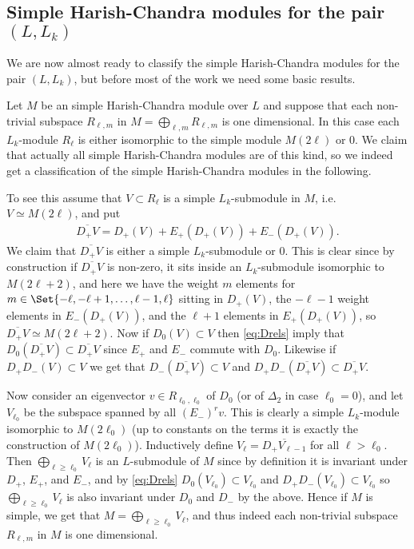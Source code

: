 \subsection{\texorpdfstring{Simple Harish-Chandra modules for the pair $(L,L_k)$}{Simple Harish-Chandra modules for the pair (L,L\_k)}}\label{sec:simplemodules}

We are now almost ready to classify the simple Harish-Chandra modules for the pair $(L,L_k)$, but before most of the work we need some basic results.

Let $M$ be an simple Harish-Chandra module over $L$ and suppose that each non-trivial subspace $R_{\ell,m}$ in $M=\bigoplus_{\ell,m} R_{\ell,m}$ is one dimensional. In this case each $L_k$-module $R_\ell$ is either isomorphic to the simple module $M(2\ell)$ or $0$. We claim that actually all simple Harish-Chandra modules are of this kind, so we indeed get a classification of the simple Harish-Chandra modules in the following.

To see this assume that $V\subset R_\ell$ is a simple $L_k$-submodule in $M$, i.e.\ $V\simeq M(2\ell)$, and put
\begin{align*}
  \overline{D_+V} = D_+(V) + E_+(D_+(V)) + E_-(D_+(V)).
\end{align*}
We claim that $\overline{D_+V}$ is either a simple $L_k$-submodule or $0$. This is clear since by construction if $\overline{D_+V}$ is non-zero, it sits inside an $L_k$-submodule isomorphic to $M(2\ell+2)$, and here we have the weight $m$ elements for $m\in\Set{-\ell,-\ell+1,\dotsc,\ell-1,\ell}$ sitting in $D_+(V)$, the $-\ell-1$ weight elements in $E_-(D_+(V))$, and the $\ell+1$ elements in $E_+(D_+(V))$, so $\overline{D_+V}\simeq M(2\ell+2)$. Now if $D_0(V)\subset V$ then \cref{eq:Drels} imply that $D_0(\overline{D_+V})\subset \overline{D_+V}$ since $E_+$ and $E_-$ commute with $D_0$. Likewise if $D_+D_-(V)\subset V$ we get that $D_-(\overline{D_+V})\subset V$ and $D_+D_-(\overline{D_+V}) \subset \overline{D_+V}$.

Now consider an eigenvector $v\in R_{\ell_0,\ell_0}$ of $D_0$ (or of $\Delta_2$ in case $\ell_0=0$), and let $V_{\ell_0}$ be the subspace spanned by all $(E_-)^rv$. This is clearly a simple $L_k$-module isomorphic to $M(2\ell_0)$ (up to constants on the terms it is exactly the construction of $M(2\ell_0)$). Inductively define $V_\ell = \overline{D_+V_{\ell-1}}$ for all $\ell>\ell_0$. Then $\bigoplus_{\ell\geq \ell_0} V_\ell$ is an $L$-submodule of $M$ since by definition it is invariant under $D_+$, $E_+$, and $E_-$, and by \cref{eq:Drels} $D_0(V_{\ell_0})\subset V_{\ell_0}$ and $D_+D_-(V_{\ell_0})\subset V_{\ell_0}$ so $\bigoplus_{\ell\geq \ell_0} V_\ell$ is also invariant under $D_0$ and $D_-$ by the above. Hence if $M$ is simple, we get that $M=\bigoplus_{\ell\geq \ell_0} V_\ell$, and thus indeed each non-trivial subspace $R_{\ell,m}$ in $M$ is one dimensional.

